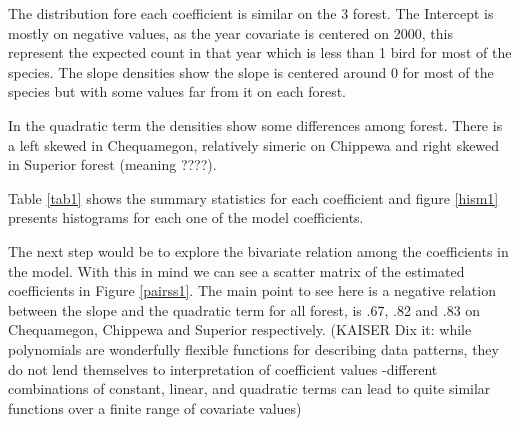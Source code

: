 \documentclass{article}
\begin{document}
The distribution fore each coefficient is similar on the 3 forest. The Intercept is mostly on negative values, as the year covariate is centered on 2000, this represent the expected count in that year which is  less than 1 bird for most of the species. The slope densities show the slope is centered around 0 for most of the species but with some values far from it on each forest. 

In the quadratic term the densities show some differences among forest. There is a left skewed in Chequamegon, relatively simeric on Chippewa and right skewed in Superior forest (meaning ????). 

Table \ref{tab1} shows the summary statistics for each coefficient and figure \ref{hism1} presents histograms for each one of the model coefficients.


The next step would be to explore the bivariate relation among the coefficients in the model. With this in mind we can see a scatter matrix of the estimated coefficients in Figure \ref{pairss1}. The main point to see here is a negative relation between the slope and the quadratic term for all forest, is .67, .82 and .83 on Chequamegon, Chippewa and Superior respectively. (KAISER Dix it: while polynomials are wonderfully flexible functions for describing data patterns, they do not lend themselves to interpretation of coefficient values -different combinations of constant, linear, and quadratic terms can lead to quite similar functions over a finite range of covariate values) 
\end{document}
